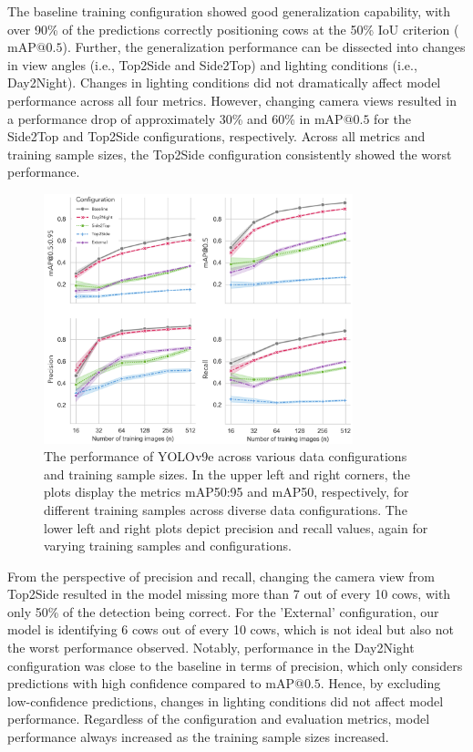 The baseline training configuration showed good generalization capability, with over 90\% of the predictions correctly positioning cows at the 50\% IoU criterion ($\text{mAP@{0.5}}$). Further, the generalization performance can be dissected into changes in view angles (i.e., Top2Side and Side2Top) and lighting conditions (i.e., Day2Night). Changes in lighting conditions did not dramatically affect model performance across all four metrics. However, changing camera views resulted in a performance drop of approximately 30\% and 60\% in $\text{mAP@{0.5}}$ for the Side2Top and Top2Side configurations, respectively. Across all metrics and training sample sizes, the Top2Side configuration consistently showed the worst performance.
\begin{figure}[h]
    \centering
    \includegraphics[width=0.8\textwidth]{figure_3.jpg}
    \caption{The performance of YOLOv9e across various data configurations and training sample sizes. In the upper left and right corners, the plots display the metrics mAP50:95 and mAP50, respectively, for different training samples across diverse data configurations. The lower left and right plots depict precision and recall values, again for varying training samples and configurations.}
    \label{fig:schemes}
    \end{figure}
From the perspective of precision and recall, changing the camera view from Top2Side resulted in the model missing more than 7 out of every 10 cows, with only 50\% of the detection being correct. For the 'External' configuration, our model is identifying 6 cows out of every 10 cows, which is not ideal but also not the worst performance observed. Notably, performance in the Day2Night configuration was close to the baseline in terms of precision, which only considers predictions with high confidence compared to $\text{mAP@{0.5}}$. Hence, by excluding low-confidence predictions, changes in lighting conditions did not affect model performance. Regardless of the configuration and evaluation metrics, model performance always increased as the training sample sizes increased.


